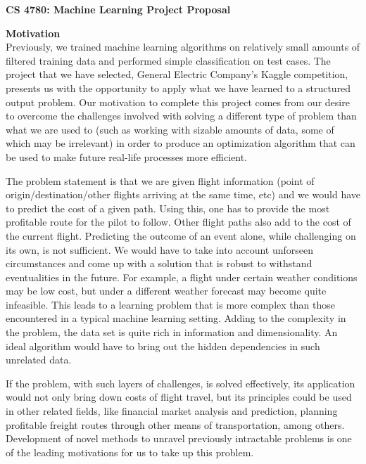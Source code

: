 \documentclass{article}[9pt]
\begin{document}
\begin{framed}
\noindent
\large{\textbf{CS 4780: Machine Learning \hfill Project Proposal}}
\end{framed}

\noindent\Large{\textbf{Motivation}}\\
\noindent Previously, we trained machine learning algorithms on relatively small amounts of filtered training data and performed simple classification on test cases. The project that we have selected, General Electric Company's Kaggle competition, presents us with the opportunity to apply what we have learned to a structured output problem. Our motivation to complete this project comes from our desire to overcome the challenges involved with solving a different type of problem than what we are used to (such as working with sizable amounts of data, some of which may be irrelevant) in order to produce an optimization algorithm that can be used to make future real-life processes more efficient.

The problem statement is that we are given flight information (point of origin/destination/other flights arriving at the same time, etc) and we would have to predict the cost of a given path. Using this, one has to provide the most profitable route for the pilot to follow. Other flight paths also add to the cost of the current flight. Predicting the outcome of an event alone, while challenging on its own, is not sufficient. We would have to take into account unforseen circumstances and come up with a solution that is robust to withstand eventualities in the future. For example, a flight under certain weather conditions may be low cost, but under a different weather forecast may become quite infeasible. This leads to a learning problem that is more complex than those encountered in a typical machine learning setting. Adding to the complexity in the problem, the data set is quite rich in information and dimensionality. An ideal algorithm would have to bring out the hidden dependencies in such unrelated data.

If the problem, with such layers of challenges, is solved effectively, its application would not only bring down costs of flight travel, but its principles could be used in other related fields, like financial market analysis and prediction, planning profitable freight routes through other means of transportation, among others. Development of novel methods to unravel previously intractable problems is one of the leading motivations for us to take up this problem.
\end{document}
